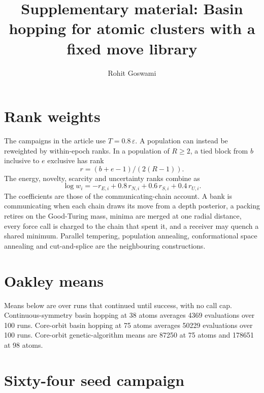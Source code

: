 \documentclass[aip,jcp,preprint,amsmath,amssymb]{revtex4-2}
\begin{document}
\title{Supplementary material: Basin hopping for atomic clusters with a fixed move library}
\author{Rohit Goswami}
\maketitle

\section{Rank weights}
The campaigns in the article use \(T=0.8\,\varepsilon\).
A population can instead be reweighted by within-epoch ranks.
In a population of \(R\ge 2\), a tied block from \(b\) inclusive to \(e\) exclusive has rank
\begin{equation}
r=(b+e-1)/(2(R-1)).
\end{equation}
The energy, novelty, scarcity and uncertainty ranks combine as
\begin{equation}
\log w_i=-r_{E,i}+0.8\,r_{N,i}+0.6\,r_{S,i}+0.4\,r_{U,i}.
\end{equation}
The coefficients are those of the communicating-chain account.\cite{goswami2023}
A bank is communicating when each chain draws its move from a depth posterior, a packing retires on the Good-Turing mass, minima are merged at one radial distance, every force call is charged to the chain that spent it, and a receiver may quench a shared minimum.
Parallel tempering, population annealing, conformational space annealing and cut-and-splice are the neighbouring constructions.\cite{swendsenReplicaMonteCarlo1986,hukushimaExchangeMonteCarlo1996,hukushimaPopulationAnnealingIts2003,machtaPopulationAnnealingWeighted2010,leeUnbiasedGlobalOptimization2003,deaven1995,geudtner2025}

\section{Oakley means}
Means below are over runs that continued until success, with no call cap.\cite{oakley2013}
Continuous-symmetry basin hopping at 38 atoms averages 4369 evaluations over 100 runs.
Core-orbit basin hopping at 75 atoms averages 50229 evaluations over 100 runs.
Core-orbit genetic-algorithm means are 87250 at 75 atoms and 178651 at 98 atoms.

\section{Sixty-four seed campaign}
{\scriptsize

}
\end{document}
